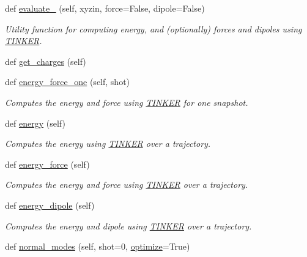 \begin{DoxyCompactItemize}
def \hyperlink{classsrc_1_1tinkerio_1_1TINKER_a49a7d06296ee436a170ebc13e518e7f6}{evaluate\+\_\+} (self, xyzin, force=False, dipole=False)
\begin{DoxyCompactList}\small\item\em Utility function for computing energy, and (optionally) forces and dipoles using \hyperlink{classsrc_1_1tinkerio_1_1TINKER}{T\+I\+N\+K\+ER}. \end{DoxyCompactList}\item 
def \hyperlink{classsrc_1_1tinkerio_1_1TINKER_a56287fffe8be5d965974fa252347bf2c}{get\+\_\+charges} (self)
\item 
def \hyperlink{classsrc_1_1tinkerio_1_1TINKER_a99b420aae7470e1fb25ba0837ee7ef16}{energy\+\_\+force\+\_\+one} (self, shot)
\begin{DoxyCompactList}\small\item\em Computes the energy and force using \hyperlink{classsrc_1_1tinkerio_1_1TINKER}{T\+I\+N\+K\+ER} for one snapshot. \end{DoxyCompactList}\item 
def \hyperlink{classsrc_1_1tinkerio_1_1TINKER_abf1dfcbc000d41955ceed37115c8591b}{energy} (self)
\begin{DoxyCompactList}\small\item\em Computes the energy using \hyperlink{classsrc_1_1tinkerio_1_1TINKER}{T\+I\+N\+K\+ER} over a trajectory. \end{DoxyCompactList}\item 
def \hyperlink{classsrc_1_1tinkerio_1_1TINKER_aaa2119b507c4840ed931f1987a133222}{energy\+\_\+force} (self)
\begin{DoxyCompactList}\small\item\em Computes the energy and force using \hyperlink{classsrc_1_1tinkerio_1_1TINKER}{T\+I\+N\+K\+ER} over a trajectory. \end{DoxyCompactList}\item 
def \hyperlink{classsrc_1_1tinkerio_1_1TINKER_ad288fa120351fbcb05201072f57d4022}{energy\+\_\+dipole} (self)
\begin{DoxyCompactList}\small\item\em Computes the energy and dipole using \hyperlink{classsrc_1_1tinkerio_1_1TINKER}{T\+I\+N\+K\+ER} over a trajectory. \end{DoxyCompactList}\item 
def \hyperlink{classsrc_1_1tinkerio_1_1TINKER_a6b6cbb8118a36e0537210de0d9e91122}{normal\+\_\+modes} (self, shot=0, \hyperlink{classsrc_1_1tinkerio_1_1TINKER_a925601bd948f7a34dd0a229da9b16f0a}{optimize}=True)

\end{DoxyCompactItemize}
